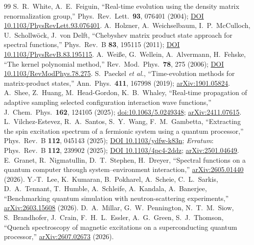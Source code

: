 \begin{thebibliography}{99}
 S.~R.~White, A.~E.~Feiguin, ``Real-time evolution using the density matrix renormalization group,'' Phys.\ Rev.\ Lett.\ \textbf{93}, 076401 (2004); \href{https://doi.org/10.1103/PhysRevLett.93.076401}{DOI 10.1103/PhysRevLett.93.076401}.
 A.~Holzner, A.~Weichselbaum, I.~P.~McCulloch, U.~Schollw\"ock, J.~von Delft, ``Chebyshev matrix product state approach for spectral functions,'' Phys.\ Rev.\ B \textbf{83}, 195115 (2011); \href{https://doi.org/10.1103/PhysRevB.83.195115}{DOI 10.1103/PhysRevB.83.195115}.
 A.~Wei{\ss}e, G.~Wellein, A.~Alvermann, H.~Fehske, ``The kernel polynomial method,'' Rev.\ Mod.\ Phys.\ \textbf{78}, 275 (2006); \href{https://doi.org/10.1103/RevModPhys.78.275}{DOI 10.1103/RevModPhys.78.275}.
 S.~Paeckel \emph{et al.}, ``Time-evolution methods for matrix-product states,'' Ann.\ Phys.\ \textbf{411}, 167998 (2019); \href{https://arxiv.org/abs/1901.05824}{arXiv:1901.05824}.
 A.~Shee, Z.~Huang, M.~Head-Gordon, K.~B.~Whaley, ``Real-time propagation of adaptive sampling selected configuration interaction wave functions,'' J.\ Chem.\ Phys.\ \textbf{162}, 124105 (2025); \href{https://doi.org/10.1063/5.0249348}{doi:10.1063/5.0249348}; \href{https://arxiv.org/abs/2411.07615}{arXiv:2411.07615}.
 L.~Vilchez-Estevez, R.~A.~Santos, S.~Y.~Wang, F.~M.~Gambetta, ``Extracting the spin excitation spectrum of a fermionic system using a quantum processor,'' Phys.\ Rev.\ B \textbf{112}, 045143 (2025); \href{https://doi.org/10.1103/ydfw-k83n}{DOI 10.1103/ydfw-k83n}; \emph{Erratum}: Phys.\ Rev.\ B \textbf{112}, 239902 (2025); \href{https://doi.org/10.1103/4pc4-2ddz}{DOI 10.1103/4pc4-2ddz}; \href{https://arxiv.org/abs/2501.04649}{arXiv:2501.04649}.
 E.~Granet, R.~Nigmatullin, D.~T.~Stephen, H.~Dreyer, ``Spectral functions on a quantum computer through system--environment interaction,'' \href{https://arxiv.org/abs/2605.01440}{arXiv:2605.01440} (2026).
 Y.-T.~Lee, K.~Kumaran, B.~Pokharel, A.~Scheie, C.~L.~Sarkis, D.~A.~Tennant, T.~Humble, A.~Schleife, A.~Kandala, A.~Banerjee, ``Benchmarking quantum simulation with neutron-scattering experiments,'' \href{https://arxiv.org/abs/2603.15608}{arXiv:2603.15608} (2026).
 D.~A.~Millar, G.~W.~Pennington, N.~T.~M.~Siow, S.~Brandhofer, J.~Crain, F.~H.~L.~Essler, A.~G.~Green, S.~J.~Thomson, ``Quench spectroscopy of magnetic excitations on a superconducting quantum processor,'' \href{https://arxiv.org/abs/2607.02673}{arXiv:2607.02673} (2026).

\end{thebibliography}
